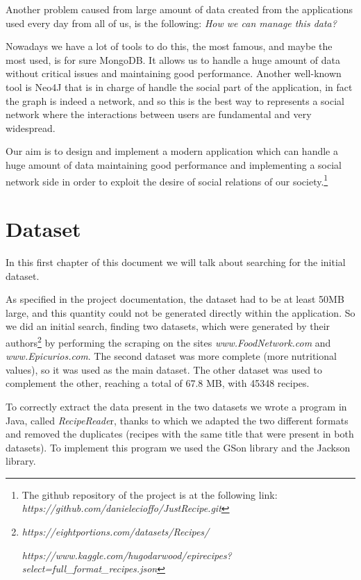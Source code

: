 \documentclass[a4paper]{report}
\begin{document}
\noindent Another problem caused from large amount of data created from the applications used every day from all of us, is the following: \emph{How we can manage this data?}

\noindent Nowadays we have a lot of tools to do this, the most famous, and maybe the most used, is for sure MongoDB. It allows us to handle a huge amount of data without critical issues and maintaining good performance. Another well-known tool is Neo4J that is in charge of handle the social part of the application, in fact the graph is indeed a network, and so this is the best way to represents a social network where the interactions between users are fundamental and very widespread.

\noindent Our aim is to design and implement a modern application which can handle a huge amount of data maintaining good performance and implementing a social network side in order to exploit the desire of social relations of our society.\footnote{The github repository of the project is at the following link: \emph{https://github.com/danielecioffo/JustRecipe.git}}



\chapter{Dataset}
In this first chapter of this document we will talk about searching for the initial dataset.

\noindent As specified in the project documentation, the dataset had to be at least 50MB large, and this quantity could not be generated directly within the application. So we did an initial search, finding two datasets, which were generated by their authors\footnote{\emph{https://eightportions.com/datasets/Recipes/}
	
 \emph{https://www.kaggle.com/hugodarwood/epirecipes?select=full\_format\_recipes.json}} by performing the scraping on the sites \emph{www.FoodNetwork.com} and \emph{www.Epicurios.com}. The second dataset was more complete (more nutritional values), so it was used as the main dataset. The other dataset was used to complement the other, reaching a total of  67.8 MB, with 45348 recipes.

\noindent To correctly extract the data present in the two datasets we wrote a program in Java, called \emph{RecipeReade}r, thanks to which we adapted the two different formats and removed the duplicates (recipes with the same title that were present in both datasets).
To implement this program we used the GSon library and the Jackson library.
\end{document}
